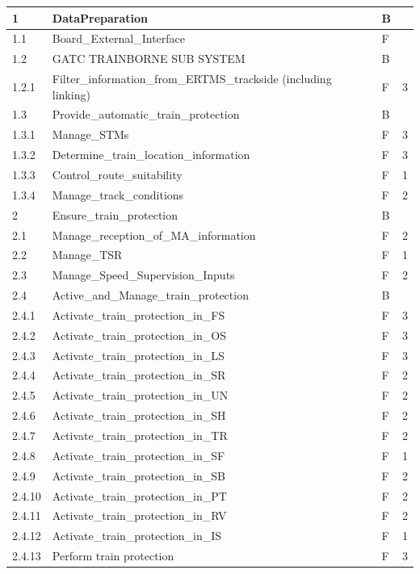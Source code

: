 \documentclass{template/openetcs_article}
\begin{document}
\begin{center}
\begin{longtable}{|m{1.5cm}|m{9cm}|m{3cm}|m{2cm}|}
\rowcolor{orange}
1 & DataPreparation & B & \\\hline
1.1 & Board\_External\_Interface & F & \\\hline
\rowcolor{orange}
1.2 & GATC TRAINBORNE SUB SYSTEM & B & \\\hline
1.2.1 & Filter\_information\_from\_ERTMS\_trackside (including linking) & F & 3 \\\hline
\rowcolor{orange}
1.3 & Provide\_automatic\_train\_protection & B & \\\hline
1.3.1 & Manage\_STMs & F & 3 \\\hline
1.3.2 & Determine\_train\_location\_information & F & 3 \\\hline
1.3.3 & Control\_route\_suitability  & F & 1 \\\hline
1.3.4 & Manage\_track\_conditions & F & 2 \\\hline
\rowcolor{orange}
2 & Ensure\_train\_protection & B & \\\hline
2.1 & Manage\_reception\_of\_MA\_information  & F & 2\\\hline
2.2 & Manage\_TSR & F& 1\\\hline
2.3 & Manage\_Speed\_Supervision\_Inputs & F & 2 \\\hline
\rowcolor{orange}
2.4 & Active\_and\_Manage\_train\_protection & B & \\\hline
2.4.1 & Activate\_train\_protection\_in\_FS & F & 3\\\hline
2.4.2 & Activate\_train\_protection\_in\_OS & F & 3\\\hline
2.4.3 & Activate\_train\_protection\_in\_LS & F & 3\\\hline
2.4.4 & Activate\_train\_protection\_in\_SR & F & 2\\\hline
2.4.5 & Activate\_train\_protection\_in\_UN & F & 2\\\hline
2.4.6 & Activate\_train\_protection\_in\_SH & F & 2\\\hline
2.4.7 & Activate\_train\_protection\_in\_TR & F & 2\\\hline
2.4.8 & Activate\_train\_protection\_in\_SF & F & 1\\\hline
2.4.9 & Activate\_train\_protection\_in\_SB & F & 2\\\hline
2.4.10 & Activate\_train\_protection\_in\_PT & F & 2\\\hline
2.4.11 & Activate\_train\_protection\_in\_RV & F & 2\\\hline
2.4.12 & Activate\_train\_protection\_in\_IS & F & 1\\\hline
2.4.13 & Perform train protection & F & 3\\\hline

\end{longtable}
\end{center}
\end{document}
